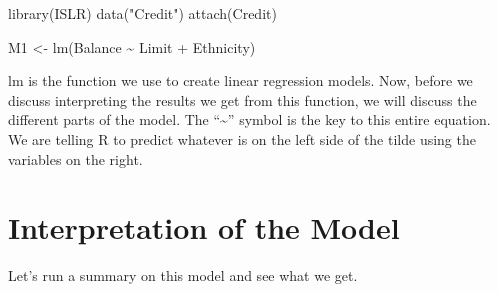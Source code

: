 \documentclass[
]{book}
\newenvironment{Shaded}{\begin{snugshade}}{\end{snugshade}}
\newcommand{\FunctionTok}[1]{\textcolor[rgb]{0.00,0.00,0.00}{#1}}
\newcommand{\NormalTok}[1]{#1}
\newcommand{\OtherTok}[1]{\textcolor[rgb]{0.56,0.35,0.01}{#1}}
\newcommand{\SpecialCharTok}[1]{\textcolor[rgb]{0.00,0.00,0.00}{#1}}
\newcommand{\StringTok}[1]{\textcolor[rgb]{0.31,0.60,0.02}{#1}}
\begin{document}
\begin{Shaded}
\begin{Highlighting}[]
\FunctionTok{library}\NormalTok{(ISLR)}
\FunctionTok{data}\NormalTok{(}\StringTok{"Credit"}\NormalTok{)}
\FunctionTok{attach}\NormalTok{(Credit)}

\NormalTok{M1 }\OtherTok{\textless{}{-}} \FunctionTok{lm}\NormalTok{(Balance }\SpecialCharTok{\textasciitilde{}}\NormalTok{ Limit }\SpecialCharTok{+}\NormalTok{ Ethnicity)}
\end{Highlighting}
\end{Shaded}

lm is the function we use to create linear regression models. Now, before we discuss interpreting the results we get from this function, we will discuss the different parts of the model. The ``\textasciitilde{}'' symbol is the key to this entire equation. We are telling R to predict whatever is on the left side of the tilde using the variables on the right.

\hypertarget{interpretation-of-the-model}{%
\section{Interpretation of the Model}\label{interpretation-of-the-model}}

Let's run a summary on this model and see what we get.
\end{document}
